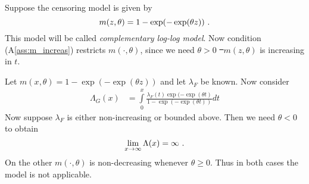 %
\begin{example}
	Suppose the censoring model is given by
	$$m(z, \theta) = 1 - \exp(-\exp(\theta z))\textrm{ .}$$
	This model will be called \textit{complementary log-log model}. Now condition (A\ref{ass:m_increas}) restricts $m(\cdot,\theta)$, since we need $\theta > 0$ \st\ $m(z,\theta)$ is increasing in $t$.
\end{example}
%
\begin{remark}
	Let $m(x,\theta)= 1 - \exp(-\exp(\theta z))$ and let $\lambda_F$ be known. Now consider
	\begin{align*}
		\Lambda_G(x) &= \int\limits_0^x\frac{\lambda_F(t)\exp(-\exp(\theta t)}{1-\exp(-\exp(\theta t))}dt
	\end{align*}
	Now suppose $\lambda_F$ is either non-increasing or bounded above. Then we need $\theta < 0$ to obtain
	$$\lim_{x\to \infty} \Lambda(x) = \infty \textrm{ .}$$
	On the other $m(\cdot,\theta)$ is non-decreasing whenever $\theta\geq 0$. Thus in both cases the model is not applicable.
\end{remark}
%


